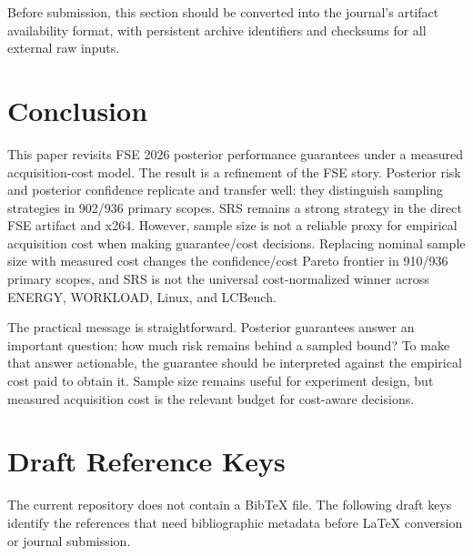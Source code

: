 \documentclass[smallcondensed]{svjour3}
\begin{document}
Before submission, this section should be converted into the journal's
artifact availability format, with persistent archive identifiers and
checksums for all external raw inputs.

\section{Conclusion}\label{conclusion}

This paper revisits FSE 2026 posterior performance guarantees under a
measured acquisition-cost model. The result is a refinement of the FSE
story. Posterior risk and posterior confidence replicate and transfer
well: they distinguish sampling strategies in 902/936 primary scopes.
SRS remains a strong strategy in the direct FSE artifact and x264.
However, sample size is not a reliable proxy for empirical acquisition
cost when making guarantee/cost decisions. Replacing nominal sample size
with measured cost changes the confidence/cost Pareto frontier in
910/936 primary scopes, and SRS is not the universal cost-normalized
winner across ENERGY, WORKLOAD, Linux, and LCBench.

The practical message is straightforward. Posterior guarantees answer an
important question: how much risk remains behind a sampled bound? To
make that answer actionable, the guarantee should be interpreted against
the empirical cost paid to obtain it. Sample size remains useful for
experiment design, but measured acquisition cost is the relevant budget
for cost-aware decisions.

\section{Draft Reference Keys}\label{draft-reference-keys}

The current repository does not contain a BibTeX file. The following
draft keys identify the references that need bibliographic metadata
before LaTeX conversion or journal submission.
\end{document}
